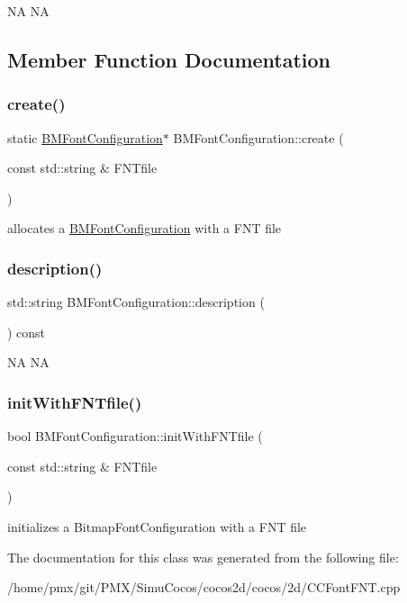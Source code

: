 NA  NA 

\subsection{Member Function Documentation}
\mbox{\label{classBMFontConfiguration_gaf6f6e33acf57e6fdf10de805002f21c6}} 
\subsubsection{\texorpdfstring{create()}{create()}}
{\footnotesize\ttfamily static \hyperlink{classBMFontConfiguration}{B\+M\+Font\+Configuration}$\ast$ B\+M\+Font\+Configuration\+::create (\begin{DoxyParamCaption}\item[{const std\+::string \&}]{F\+N\+Tfile }\end{DoxyParamCaption})\hspace{0.3cm}{\ttfamily [static]}}

allocates a \hyperlink{classBMFontConfiguration}{B\+M\+Font\+Configuration} with a F\+NT file \mbox{\label{classBMFontConfiguration_gab5b833ca803bff72c9ab19abf55eb8ac}} 
\subsubsection{\texorpdfstring{description()}{description()}}
{\footnotesize\ttfamily std\+::string B\+M\+Font\+Configuration\+::description (\begin{DoxyParamCaption}{ }\end{DoxyParamCaption}) const}

NA  NA \mbox{\label{classBMFontConfiguration_ga0eb7f4ea5cc521e1502006c04cc67733}} 
\subsubsection{\texorpdfstring{init\+With\+F\+N\+Tfile()}{initWithFNTfile()}}
{\footnotesize\ttfamily bool B\+M\+Font\+Configuration\+::init\+With\+F\+N\+Tfile (\begin{DoxyParamCaption}\item[{const std\+::string \&}]{F\+N\+Tfile }\end{DoxyParamCaption})}

initializes a Bitmap\+Font\+Configuration with a F\+NT file 

The documentation for this class was generated from the following file\+:\begin{DoxyCompactItemize}
\item 
/home/pmx/git/\+P\+M\+X/\+Simu\+Cocos/cocos2d/cocos/2d/C\+C\+Font\+F\+N\+T.\+cpp\end{DoxyCompactItemize}
